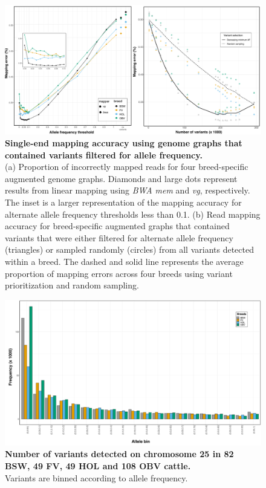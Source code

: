 \documentclass[../main.tex]{subfiles}
\begin{document}
\begin{flushleft}
\begin{figure}[!htb]
    \centering
    \includegraphics[width=\textwidth]{paper2/supplement/sp32.pdf}
    \caption[Single-end mapping accuracy]{\textbf{Single-end mapping accuracy using genome graphs that contained
    variants filtered for allele frequency.} \\
    \small{(a) Proportion of incorrectly mapped reads for four breed-specific augmented
    genome graphs. Diamonds and large dots represent results from linear mapping
    using \emph{BWA mem} and \emph{vg}, respectively. The inset is a larger representation of the
    mapping accuracy for alternate allele frequency thresholds less than 0.1. (b) Read
    mapping accuracy for breed-specific augmented graphs that contained variants that
    were either filtered for alternate allele frequency (triangles) or sampled randomly
    (circles) from all variants detected within a breed. The dashed and solid line
    represents the average proportion of mapping errors across four breeds using
    variant prioritization and random sampling. }}
    \label{sup_fig:s32}
\end{figure}


\begin{figure}[!htb]
    \centering
    \includegraphics[width=\textwidth]{paper2/supplement/sp33.pdf}
    \caption[Number of variants detected on chromosome 25]{\textbf{Number of variants detected on chromosome 25 in 82 BSW, 49 FV,
    49 HOL and 108 OBV cattle.} \\
    \small{Variants are binned according to allele frequency.}}
    \label{sup_fig:s33}
\end{figure}


\end{flushleft}
\end{document}
